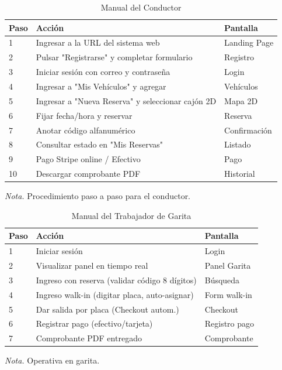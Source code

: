 \begin{table}[htbp]
\caption{Manual del Conductor}
\label{tab:manual_conductor_v2}
\begin{tabular}{@{}p{0.5cm} p{10.5cm} p{4cm}@{}}
\toprule
\textbf{Paso} & \textbf{Acción} & \textbf{Pantalla} \\
\midrule
1 & Ingresar a la URL del sistema web & Landing Page \\
2 & Pulsar "Registrarse" y completar formulario & Registro \\
3 & Iniciar sesión con correo y contraseña & Login \\
4 & Ingresar a "Mis Vehículos" y agregar & Vehículos \\
5 & Ingresar a "Nueva Reserva" y seleccionar cajón 2D & Mapa 2D \\
6 & Fijar fecha/hora y reservar & Reserva \\
7 & Anotar código alfanumérico & Confirmación \\
8 & Consultar estado en "Mis Reservas" & Listado \\
9 & Pago Stripe online / Efectivo & Pago \\
10 & Descargar comprobante PDF & Historial \\
\bottomrule
\end{tabular}
\par\vspace{0.2cm}
\textit{Nota.} Procedimiento paso a paso para el conductor.
\end{table}

\begin{table}[htbp]
\caption{Manual del Trabajador de Garita}
\label{tab:manual_trabajador_v2}
\begin{tabular}{@{}p{0.5cm} p{10.5cm} p{4cm}@{}}
\toprule
\textbf{Paso} & \textbf{Acción} & \textbf{Pantalla} \\
\midrule
1 & Iniciar sesión & Login \\
2 & Visualizar panel en tiempo real & Panel Garita \\
3 & Ingreso con reserva (validar código 8 dígitos) & Búsqueda \\
4 & Ingreso walk-in (digitar placa, auto-asignar) & Form walk-in \\
5 & Dar salida por placa (Checkout autom.) & Checkout \\
6 & Registrar pago (efectivo/tarjeta) & Registro pago \\
7 & Comprobante PDF entregado & Comprobante \\
\bottomrule
\end{tabular}
\par\vspace{0.2cm}
\textit{Nota.} Operativa en garita.
\end{table}

